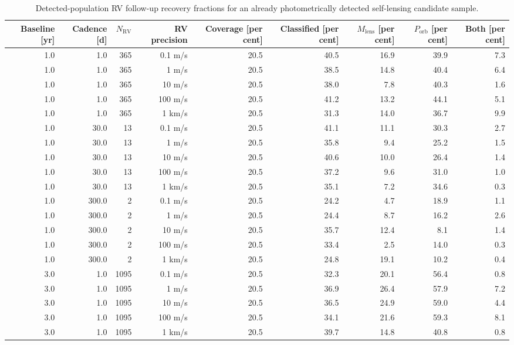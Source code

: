 \begin{table}
\centering
\scriptsize
\setlength{\tabcolsep}{3pt}
\caption{Detected-population RV follow-up recovery fractions for an already photometrically detected self-lensing candidate sample.}
\label{tab:population-weighted-followup-summary}
\begin{tabular}{rrrrrrrrr}
\hline
Baseline [yr] & Cadence [d] & $N_\mathrm{RV}$ & RV precision & Coverage [per cent] & Classified [per cent] & $M_\mathrm{lens}$ [per cent] & $P_\mathrm{orb}$ [per cent] & Both [per cent] \\
\hline
1.0 & 1.0 & 365 & 0.1 m/s & 20.5 & 40.5 & 16.9 & 39.9 & 7.3 \\
1.0 & 1.0 & 365 & 1 m/s & 20.5 & 38.5 & 14.8 & 40.4 & 6.4 \\
1.0 & 1.0 & 365 & 10 m/s & 20.5 & 38.0 & 7.8 & 40.3 & 1.6 \\
1.0 & 1.0 & 365 & 100 m/s & 20.5 & 41.2 & 13.2 & 44.1 & 5.1 \\
1.0 & 1.0 & 365 & 1 km/s & 20.5 & 31.3 & 14.0 & 36.7 & 9.9 \\
1.0 & 30.0 & 13 & 0.1 m/s & 20.5 & 41.1 & 11.1 & 30.3 & 2.7 \\
1.0 & 30.0 & 13 & 1 m/s & 20.5 & 35.8 & 9.4 & 25.2 & 1.5 \\
1.0 & 30.0 & 13 & 10 m/s & 20.5 & 40.6 & 10.0 & 26.4 & 1.4 \\
1.0 & 30.0 & 13 & 100 m/s & 20.5 & 37.2 & 9.6 & 31.0 & 1.0 \\
1.0 & 30.0 & 13 & 1 km/s & 20.5 & 35.1 & 7.2 & 34.6 & 0.3 \\
1.0 & 300.0 & 2 & 0.1 m/s & 20.5 & 24.2 & 4.7 & 18.9 & 1.1 \\
1.0 & 300.0 & 2 & 1 m/s & 20.5 & 24.4 & 8.7 & 16.2 & 2.6 \\
1.0 & 300.0 & 2 & 10 m/s & 20.5 & 35.7 & 12.4 & 8.1 & 1.4 \\
1.0 & 300.0 & 2 & 100 m/s & 20.5 & 33.4 & 2.5 & 14.0 & 0.3 \\
1.0 & 300.0 & 2 & 1 km/s & 20.5 & 24.8 & 19.1 & 10.2 & 0.4 \\
3.0 & 1.0 & 1095 & 0.1 m/s & 20.5 & 32.3 & 20.1 & 56.4 & 0.8 \\
3.0 & 1.0 & 1095 & 1 m/s & 20.5 & 36.9 & 26.4 & 57.9 & 7.2 \\
3.0 & 1.0 & 1095 & 10 m/s & 20.5 & 36.5 & 24.9 & 59.0 & 4.4 \\
3.0 & 1.0 & 1095 & 100 m/s & 20.5 & 34.1 & 21.6 & 59.3 & 8.1 \\
3.0 & 1.0 & 1095 & 1 km/s & 20.5 & 39.7 & 14.8 & 40.8 & 0.8 \\

\end{tabular}
\end{table}
